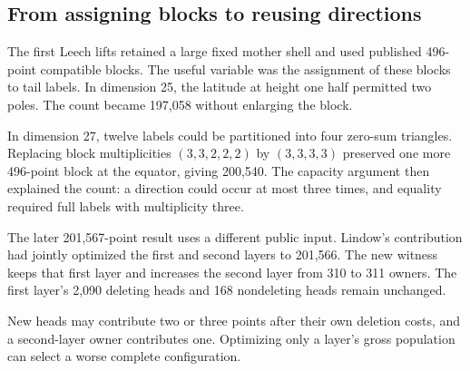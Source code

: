 \subsection{From assigning blocks to reusing
directions}

The first Leech lifts retained a large fixed mother shell and used
published 496-point compatible blocks. The useful variable was the
assignment of these blocks to tail labels. In dimension 25, the latitude
at height one half permitted two poles. The count became 197,058 without
enlarging the block.

In dimension 27, twelve labels could be partitioned into four zero-sum
triangles. Replacing block multiplicities \((3,3,2,2,2)\) by
\((3,3,3,3)\) preserved one more 496-point block at the equator, giving
200,540. The capacity argument then explained the count: a direction
could occur at most three times, and equality required full labels with
multiplicity three.

The later 201,567-point result uses a different public input. Lindow's
contribution had jointly optimized the first and second layers to
201,566. The new witness keeps that first layer and increases the second
layer from 310 to 311 owners. The first layer's 2,090 deleting heads and
168 nondeleting heads remain unchanged.

New heads may contribute two or three points after their own deletion
costs, and a second-layer owner contributes one. Optimizing only a
layer's gross population can select a worse complete configuration.
